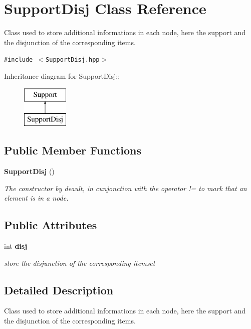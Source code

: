 \section{Support\-Disj Class Reference}
\label{class_support_disj}
Class used to store additional informations in each node, here the support and the disjunction of the corresponding items.  


{\tt \#include $<$Support\-Disj.hpp$>$}

Inheritance diagram for Support\-Disj::\begin{figure}[H]
\begin{center}
\leavevmode
\includegraphics[height=2cm]{class_support_disj}
\end{center}
\end{figure}
\subsection*{Public Member Functions}
\begin{CompactItemize}
\item 
{\bf Support\-Disj} ()
\begin{CompactList}\small\item\em The constructor by deault, in cunjonction with the operator != to mark that an element is in a node. \item\end{CompactList}\end{CompactItemize}
\subsection*{Public Attributes}
\begin{CompactItemize}
\item 
int {\bf disj}\label{class_support_disj_ca1aa0fb612051f04e0ea48051fea157}

\begin{CompactList}\small\item\em store the disjunction of the corresponding itemset \item\end{CompactList}\end{CompactItemize}


\subsection{Detailed Description}
Class used to store additional informations in each node, here the support and the disjunction of the corresponding items. 

